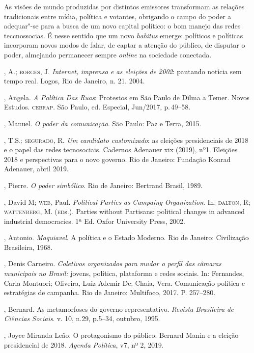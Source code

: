 As visões de mundo produzidas por distintos emissores transformam as
relações tradicionais entre mídia, política e votantes, obrigando o
campo do poder a adequar"-se para a busca de um novo capital político: o
bom manejo das redes teccnossocias. É nesse sentido que um novo
\emph{habitus} emerge: políticos e políticas incorporam novos modos de
falar, de captar a atenção do público, de disputar o poder, almejando
permanecer sempre \emph{online} na sociedade conectada.


\begin{bibliohedra}
, A.; \textsc{borges}, J. \emph{Internet, imprensa e as eleições de 2002}:
pautando notícia sem tempo real. Logos, Rio de Janeiro, n. 21. 2004.

, Angela. \emph{A Política Das Ruas}: Protestos em São Paulo de
Dilma a Temer. Novos Estudos. \textsc{cebrap}. São Paulo, ed. Especial, Jun/2017,
p.\,49--58.

, Manuel. \emph{O poder da comunicação}. São Paulo: Paz e
Terra, 2015.

, T.S.; \textsc{segurado}, R. \emph{Um candidato customizado}: as
eleições presidenciais de 2018 e o papel das redes tecnosociais.
Cadernos Adenauer xix (2019), nº1. Eleições 2018 e perspectivas para o
novo governo. Rio de Janeiro: Fundação Konrad Adenauer, abril 2019.

, Pierre. \emph{O poder simbólico}. Rio de Janeiro: Bertrand
Brasil, 1989.

, David M; \textsc{web}, Paul. \emph{Political Parties as Campaing
Organization}. In. \textsc{dalton}, R; \textsc{wattenberg}, M. (\textsc{ed}s.). Parties without
Partisans: political changes in advanced industrial democracies. 1ª Ed.
Oxfor University Press, 2002.

, Antonio. \emph{Maquiavel}. A política e o Estado Moderno. Rio
de Janeiro: Civilização Brasileira, 1968.

, Denis Carneiro. \emph{Coletivos organizados para mudar o perfil
das câmaras municipais no Brasil:} jovens, política, plataforma e redes
sociais. In: Fernandes, Carla Montuori; Oliveira, Luiz Ademir De; Chaia,
Vera. Comunicação política e estratégias de campanha. Rio de Janeiro:
Multifoco, 2017. P. 257--280.

, Bernard. As metamorfoses do governo representativo.
\emph{Revista Brasileira de Ciências Sociais}. v. 10, n.29, p.5--34,
outubro, 1995.

, Joyce Miranda Leão. O protagonismo do público: Bernard Manin e
a eleição presidencial de 2018. \emph{Agenda Política}, v7, nº 2,
2019.


\end{bibliohedra}
